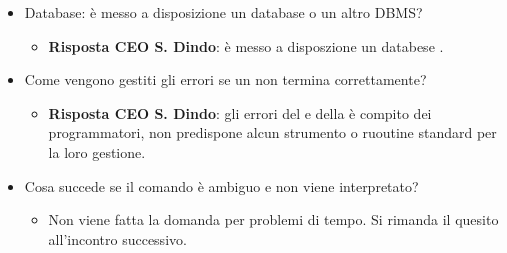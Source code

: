 \begin{itemize}
\begin{itemize}
			\end{itemize}
			\item Database: è messo a disposizione un database  o un altro DBMS?
			\begin{itemize}
				\item \textbf{Risposta CEO S. Dindo}: è messo a disposzione un databese .
			\end{itemize}
			\item Come vengono gestiti gli errori se un  non termina correttamente?
			\begin{itemize}
				\item \textbf{Risposta CEO S. Dindo}: gli errori del  e della  è compito dei programmatori,  non predispone alcun strumento o ruoutine standard per la loro gestione.
			\end{itemize}
			\item Cosa succede se il comando è ambiguo e non viene interpretato?
			\begin{itemize}
				\item Non viene fatta la domanda per problemi di tempo. Si rimanda il quesito all'incontro successivo.
			\end{itemize}
		\end{itemize}

